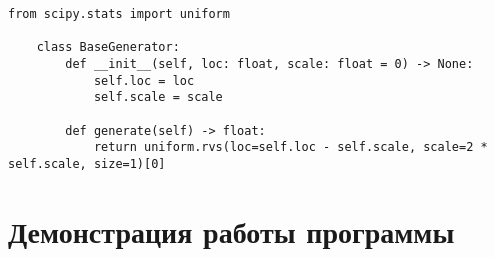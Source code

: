 \clearpage

\begin{lstlisting}
from scipy.stats import uniform

	class BaseGenerator:
		def __init__(self, loc: float, scale: float = 0) -> None:
			self.loc = loc
			self.scale = scale
	
		def generate(self) -> float:
			return uniform.rvs(loc=self.loc - self.scale, scale=2 * self.scale, size=1)[0]
\end{lstlisting}


\clearpage

\section*{Демонстрация работы программы}

\clearpage







